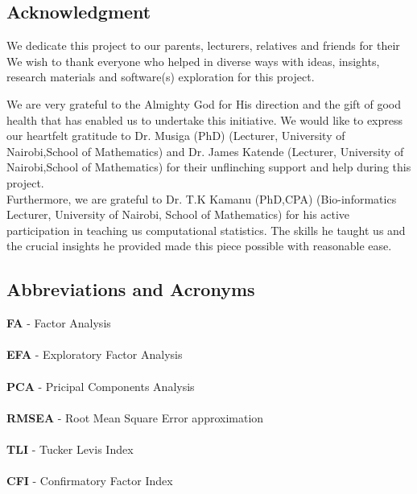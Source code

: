 \documentclass{article}
\begin{document}
\newpage

\subsection{Acknowledgment}
We dedicate this project to our parents, lecturers, relatives and friends for their We wish to thank everyone who helped in diverse ways with ideas, insights, research materials and software(s) exploration for this project.

\noindent We are very grateful to the Almighty God for His direction and the gift of good health that has enabled us to undertake this initiative. We would like to express our heartfelt gratitude to Dr. Musiga (PhD) (Lecturer, University of Nairobi,School of Mathematics) and Dr. James Katende (Lecturer, University of Nairobi,School of Mathematics) for their unflinching support and help during this project.\\
Furthermore, we are grateful to Dr. T.K Kamanu (PhD,CPA) (Bio-informatics Lecturer, University of Nairobi, School of Mathematics) for his active participation in teaching us computational statistics. The skills he taught us and the crucial insights he provided made this piece possible with reasonable ease. 

\newpage
\subsection{Abbreviations and Acronyms}
\textbf{FA} -  Factor Analysis\\\\
\textbf{EFA} - Exploratory Factor Analysis\\\\
\textbf{PCA} - Pricipal Components Analysis\\\\
\textbf{RMSEA} - Root Mean Square Error approximation\\\\
\textbf{TLI} - Tucker Levis Index\\\\
\textbf{CFI} - Confirmatory Factor Index

\newpage
\end{document}
